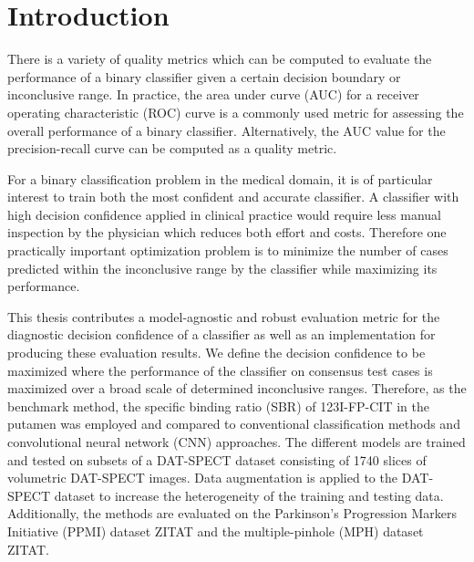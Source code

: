 \section{Introduction}
\label{sec:intro}









There is a variety of quality metrics which can be computed to evaluate the performance of a binary classifier 
given a certain decision boundary or inconclusive range.
In practice, the area under curve (AUC) for a receiver operating characteristic (ROC) curve is a commonly used metric 
for assessing the overall performance of a binary classifier.
Alternatively, the AUC value for the precision-recall curve can be computed as a quality metric. 

For a binary classification problem in the medical domain, it is of particular interest to train both the most confident and 
accurate classifier.
A classifier with high decision confidence applied in clinical practice would require less manual inspection by the
physician which reduces both effort and costs.
Therefore one practically important optimization problem is to minimize the number of cases predicted within the inconclusive range 
by the classifier while maximizing its performance.


This thesis contributes a model-agnostic and robust evaluation metric for the diagnostic decision confidence of a classifier 
as well as an implementation for producing these evaluation results.
We define the decision confidence to be maximized where the performance of the classifier on consensus test cases 
is maximized over a broad scale of determined inconclusive ranges.
Therefore, as the benchmark method, the specific binding ratio (SBR) of 123I-FP-CIT in the putamen was employed and 
compared to conventional classification methods and convolutional neural network (CNN) approaches.
The different models are trained and tested on subsets of a DAT-SPECT dataset consisting of 1740 slices of 
volumetric DAT-SPECT images.
Data augmentation is applied to the DAT-SPECT dataset to increase the heterogeneity of the training and testing data.
Additionally, the methods are evaluated on the Parkinson's Progression Markers Initiative (PPMI) dataset ZITAT and 
the multiple-pinhole (MPH) dataset ZITAT.







